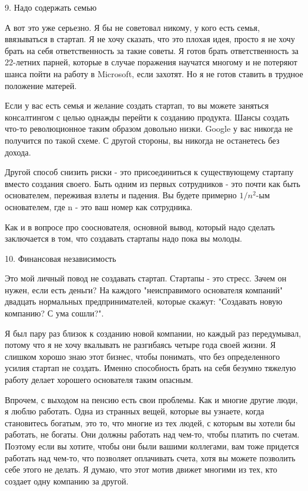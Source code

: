 \documentclass[ebook,12pt,oneside,openany]{memoir}
\begin{document}
9. Надо содержать семью

А вот это уже серьезно. Я бы не советовал никому, у кого есть семья,
ввязываться в стартап. Я не хочу сказать, что это плохая идея, просто
я не хочу брать на себя ответственность за такие советы. Я готов брать
ответственность за 22-летних парней, которые в случае поражения
научатся многому и не потеряют шанса пойти на работу в Microsoft, если
захотят. Но я не готов ставить в трудное положение матерей.

Если у вас есть семья и желание создать стартап, то вы можете заняться
консалтингом с целью однажды перейти к созданию продукта. Шансы
создать что-то революционное таким образом довольно низки. Google у
вас никогда не получится по такой схеме. С другой стороны, вы никогда
не останетесь без дохода.

Другой способ снизить риски - это присоединиться к существующему
стартапу вместо создания своего. Быть одним из первых сотрудников -
это почти как быть основателем, переживая взлеты и падения. Вы будете
примерно $ 1/n^2 $-ым основателем, где n - это ваш номер как
сотрудника.

Как и в вопросе про сооснователя, основной вывод, который надо сделать
заключается в том, что создавать стартапы надо пока вы молоды.

10. Финансовая независимость

Это мой личный повод не создавать стартап. Стартапы - это стресс.
Зачем он нужен, если есть деньги? На каждого "неисправимого основателя
компаний" двадцать нормальных предпринимателей, которые скажут:
"Создавать новую компанию? С ума сошли?".

Я был пару раз близок к созданию новой компании, но каждый раз
передумывал, потому что я не хочу вкалывать не разгибаясь четыре года
своей жизни. Я слишком хорошо знаю этот бизнес, чтобы понимать, что
без определенного усилия стартап не создать. Именно способность брать
на себя безумно тяжелую работу делает хорошего основателя таким
опасным.

Впрочем, с выходом на пенсию есть свои проблемы. Как и многие другие
люди, я люблю работать. Одна из странных вещей, которые вы узнаете,
когда становитесь богатым, это то, что многие из тех людей, с которым
вы хотели бы работать, не богаты. Они должны работать над чем-то,
чтобы платить по счетам. Поэтому если вы хотите, чтобы они были вашими
коллегами, вам тоже придется работать над чем-то, что позволяет
оплачивать счета, хотя вы можете позволить себе этого не делать. Я
думаю, что этот мотив движет многими из тех, кто создает одну компанию
за другой.
\end{document}
